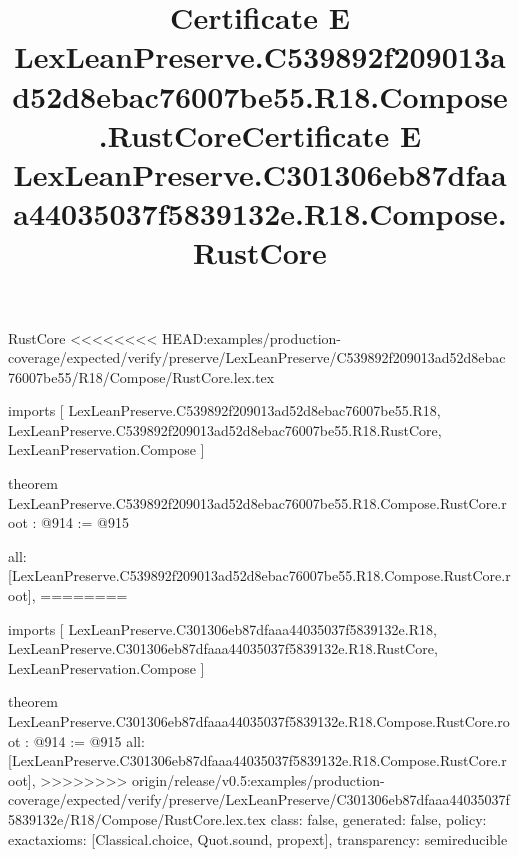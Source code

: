 \begin{lexlean}{RustCore}
<<<<<<<< HEAD:examples/production-coverage/expected/verify/preserve/LexLeanPreserve/C539892f209013ad52d8ebac76007be55/R18/Compose/RustCore.lex.tex
\title{Certificate E LexLeanPreserve.C539892f209013ad52d8ebac76007be55.R18.Compose.RustCore}
\begin{coremodule}
imports [
  LexLeanPreserve.C539892f209013ad52d8ebac76007be55.R18,
  LexLeanPreserve.C539892f209013ad52d8ebac76007be55.R18.RustCore,
  LexLeanPreservation.Compose
]

theorem LexLeanPreserve.C539892f209013ad52d8ebac76007be55.R18.Compose.RustCore.root : @914 := @915 {
  all: [LexLeanPreserve.C539892f209013ad52d8ebac76007be55.R18.Compose.RustCore.root],
========
\title{Certificate E LexLeanPreserve.C301306eb87dfaaa44035037f5839132e.R18.Compose.RustCore}
\begin{coremodule}
imports [
  LexLeanPreserve.C301306eb87dfaaa44035037f5839132e.R18,
  LexLeanPreserve.C301306eb87dfaaa44035037f5839132e.R18.RustCore,
  LexLeanPreservation.Compose
]

theorem LexLeanPreserve.C301306eb87dfaaa44035037f5839132e.R18.Compose.RustCore.root : @914 := @915 {
  all: [LexLeanPreserve.C301306eb87dfaaa44035037f5839132e.R18.Compose.RustCore.root],
>>>>>>>> origin/release/v0.5:examples/production-coverage/expected/verify/preserve/LexLeanPreserve/C301306eb87dfaaa44035037f5839132e/R18/Compose/RustCore.lex.tex
  class: false,
  generated: false,
  policy: exact{axioms: [Classical.choice, Quot.sound, propext]},
  transparency: semireducible
}


\end{coremodule}}
\end{coremodule}
\end{lexlean}
